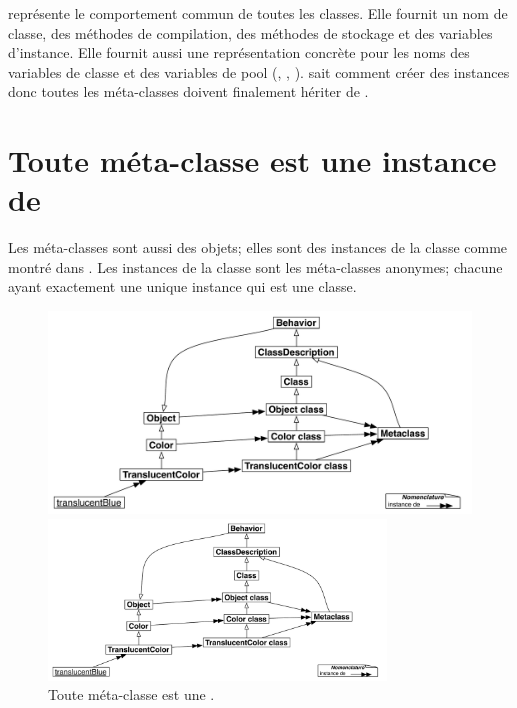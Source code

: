 \documentclass[a4paper,10pt,twoside]{book}
\begin{document}
 représente le comportement commun de toutes les classes.
Elle fournit un nom de classe, des méthodes de compilation, des méthodes de stockage et des variables d'instance.
Elle fournit aussi  une représentation concrète pour les noms des variables de classe et des variables de pool (, , ).
 sait comment créer des instances donc toutes les méta-classes doivent finalement hériter de .


\section{Toute méta-classe est une instance de }

Les méta-classes sont aussi des objets; elles sont des instances de la classe  comme montré dans .
Les instances de la classe  sont les méta-classes anonymes; chacune ayant exactement une unique instance qui est une classe.

\begin{center}
\begin{figure}
\ifluluelse
	{\centerline{\includegraphics[width=\textwidth]{TranslucentMetaclassClass}}}
	{\centerline{\includegraphics[width=0.8\textwidth]{TranslucentMetaclassClass}}}
\caption{Toute méta-classe est une .}
\end{figure}
\end{center}
\end{document}
